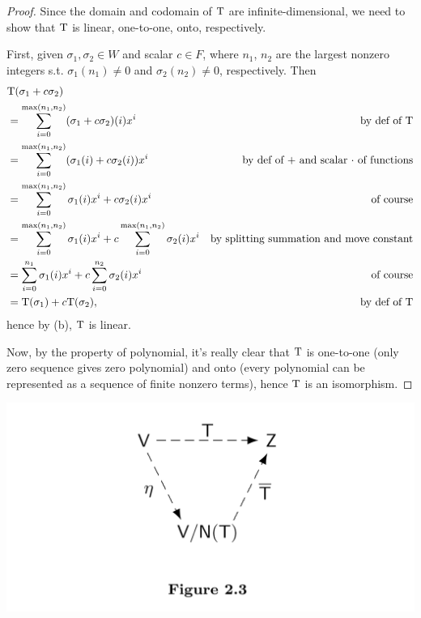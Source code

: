 \begin{proof}
Since the domain and codomain of \(\mathrm{T}\) are infinite-dimensional, we need to show that \(\mathrm{T}\) is linear, one-to-one, onto, respectively.

First, given \(\sigma_1, \sigma_2 \in W\) and scalar \(c \in F\), where \(n_1\), \(n_2\) are the largest nonzero integers s.t. \(\sigma_1(n_1) \ne 0\) and \(\sigma_2(n_2) \ne 0\), respectively.
Then
\begin{align*}
    & \mathrm{T}(\sigma_1 + c \sigma_2) \\
    & = \sum_{i = 0}^{\max(n_1, n_2)} (\sigma_1 + c \sigma_2)(i) x^i & \text{by def of \(\mathrm{T}\)} \\
    & = \sum_{i = 0}^{\max(n_1, n_2)} (\sigma_1(i) + c \sigma_2(i)) x^i & \text{by def of \(+\) and scalar \(\cdot\) of functions} \\
    & = \sum_{i = 0}^{\max(n_1, n_2)} \sigma_1(i) x^i + c \sigma_2(i) x^i & \text{of course} \\
    & = \sum_{i = 0}^{\max(n_1, n_2)} \sigma_1(i) x^i + c \sum_{i = 0}^{\max(n_1, n_2)} \sigma_2(i) x^i & \text{by splitting summation and move constant} \\
    & = \sum_{i = 0}^{n_1} \sigma_1(i) x^i + c \sum_{i = 0}^{n_2} \sigma_2(i) x^i & \text{of course} \\
    & = \mathrm{T}(\sigma_1) + c\mathrm{T}(\sigma_2), & \text{by def of \(\mathrm{T}\)}
\end{align*}
hence by (b), \(\mathrm{T}\) is linear.

Now, by the property of polynomial, it's really clear that \(\mathrm{T}\) is one-to-one (only zero sequence gives zero polynomial) and onto (every polynomial can be represented as a sequence of finite nonzero terms), hence \(\mathrm{T}\) is an isomorphism.
\end{proof}

\includegraphics[width=16cm]{images/figure-2-3.png}


